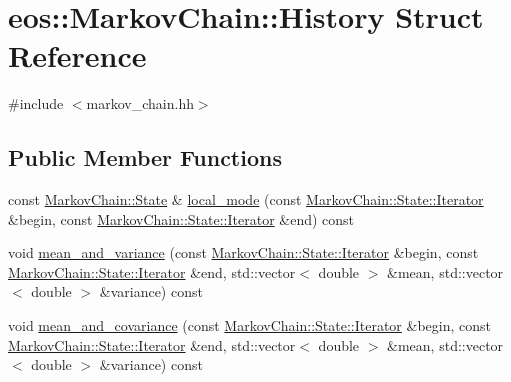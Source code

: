 \hypertarget{structeos_1_1MarkovChain_1_1History}{
\section{eos::MarkovChain::History Struct Reference}
\label{structeos_1_1MarkovChain_1_1History}
}


{\ttfamily \#include $<$markov\_\-chain.hh$>$}\subsection*{Public Member Functions}
\begin{DoxyCompactItemize}
\item 
const \hyperlink{structeos_1_1MarkovChain_1_1State}{MarkovChain::State} \& \hyperlink{structeos_1_1MarkovChain_1_1History_a590c268edb22f3d607dd7757f0bad114}{local\_\-mode} (const \hyperlink{structeos_1_1MarkovChain_1_1State_ad7590843e4feca7e696c53863e6e10c1}{MarkovChain::State::Iterator} \&begin, const \hyperlink{structeos_1_1MarkovChain_1_1State_ad7590843e4feca7e696c53863e6e10c1}{MarkovChain::State::Iterator} \&end) const 
\item 
void \hyperlink{structeos_1_1MarkovChain_1_1History_a4aa855975e42d10d25e43d327e4ef72a}{mean\_\-and\_\-variance} (const \hyperlink{structeos_1_1MarkovChain_1_1State_ad7590843e4feca7e696c53863e6e10c1}{MarkovChain::State::Iterator} \&begin, const \hyperlink{structeos_1_1MarkovChain_1_1State_ad7590843e4feca7e696c53863e6e10c1}{MarkovChain::State::Iterator} \&end, std::vector$<$ double $>$ \&mean, std::vector$<$ double $>$ \&variance) const 
\item 
void \hyperlink{structeos_1_1MarkovChain_1_1History_a759445b30a1b1034937969a8db6e7668}{mean\_\-and\_\-covariance} (const \hyperlink{structeos_1_1MarkovChain_1_1State_ad7590843e4feca7e696c53863e6e10c1}{MarkovChain::State::Iterator} \&begin, const \hyperlink{structeos_1_1MarkovChain_1_1State_ad7590843e4feca7e696c53863e6e10c1}{MarkovChain::State::Iterator} \&end, std::vector$<$ double $>$ \&mean, std::vector$<$ double $>$ \&variance) const 
\end{DoxyCompactItemize}
